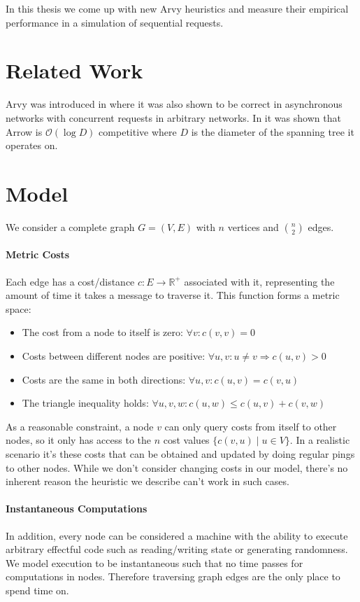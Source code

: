 \documentclass[a4paper, oneside]{discothesis}
\begin{document}
In this thesis we come up with new Arvy heuristics and measure their empirical performance in a simulation of sequential requests.

\section{Related Work}

Arvy was introduced in \cite{Arvy} where it was also shown to be correct in asynchronous networks with concurrent requests in arbitrary networks. In \cite{Kuhn} it was shown that Arrow is $\mathcal{O}(\log D)$ competitive where $D$ is the diameter of the spanning tree it operates on. 


\newpage
\section{Model}\label{model}

We consider a complete graph $G=(V,E)$ with $n$ vertices and $\binom{n}{2}$ edges.

\paragraph{Metric Costs} Each edge has a cost/distance $c : E \rightarrow \mathbb{R}^+$ associated with it, representing the amount of time it takes a message to traverse it. This function forms a metric space:
\begin{itemize}
\item The cost from a node to itself is zero: $\forall v:c(v, v)=0$
\item Costs between different nodes are positive: $\forall u,v : u\neq v\Rightarrow c(u,v)>0$
\item Costs are the same in both directions: $\forall u,v : c(u,v)=c(v,u)$
\item The triangle inequality holds: $\forall u,v,w : c(u,w)\leq c(u,v)+c(v,w)$
\end{itemize}

As a reasonable constraint, a node $v$ can only query costs from itself to other nodes, so it only has access to the $n$ cost values $\{c(v, u)\;|\;u\in V\}$. In a realistic scenario it's these costs that can be obtained and updated by doing regular pings to other nodes. While we don't consider changing costs in our model, there's no inherent reason the heuristic we describe can't work in such cases.

\paragraph{Instantaneous Computations} In addition, every node can be considered a machine with the ability to execute arbitrary effectful code such as reading/writing state or generating randomness. We model execution to be instantaneous such that no time passes for computations in nodes. Therefore traversing graph edges are the only place to spend time on.
\end{document}
